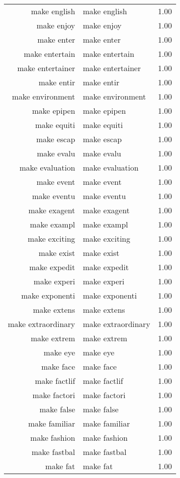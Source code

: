 \begin{table}[ht]
\begin{tabular}{rlr}
  make english & make english & 1.00 \\ 
  make enjoy & make enjoy & 1.00 \\ 
  make enter & make enter & 1.00 \\ 
  make entertain & make entertain & 1.00 \\ 
  make entertainer & make entertainer & 1.00 \\ 
  make entir & make entir & 1.00 \\ 
  make environment & make environment & 1.00 \\ 
  make epipen & make epipen & 1.00 \\ 
  make equiti & make equiti & 1.00 \\ 
  make escap & make escap & 1.00 \\ 
  make evalu & make evalu & 1.00 \\ 
  make evaluation & make evaluation & 1.00 \\ 
  make event & make event & 1.00 \\ 
  make eventu & make eventu & 1.00 \\ 
  make exagent & make exagent & 1.00 \\ 
  make exampl & make exampl & 1.00 \\ 
  make exciting & make exciting & 1.00 \\ 
  make exist & make exist & 1.00 \\ 
  make expedit & make expedit & 1.00 \\ 
  make experi & make experi & 1.00 \\ 
  make exponenti & make exponenti & 1.00 \\ 
  make extens & make extens & 1.00 \\ 
  make extraordinary & make extraordinary & 1.00 \\ 
  make extrem & make extrem & 1.00 \\ 
  make eye & make eye & 1.00 \\ 
  make face & make face & 1.00 \\ 
  make factlif & make factlif & 1.00 \\ 
  make factori & make factori & 1.00 \\ 
  make false & make false & 1.00 \\ 
  make familiar & make familiar & 1.00 \\ 
  make fashion & make fashion & 1.00 \\ 
  make fastbal & make fastbal & 1.00 \\ 
  make fat & make fat & 1.00 \\ 

\end{tabular}
\end{table}
